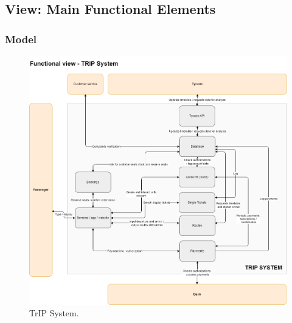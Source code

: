 \subsection{View: Main Functional Elements}

\subsubsection{Model}

\begin{figure}[H]
    \centering
    \includegraphics[width=\textwidth]{drawings/views_final_version/functional_view.png}
    \caption{TrIP System.}
    \label{fig:trip_system}
\end{figure}

